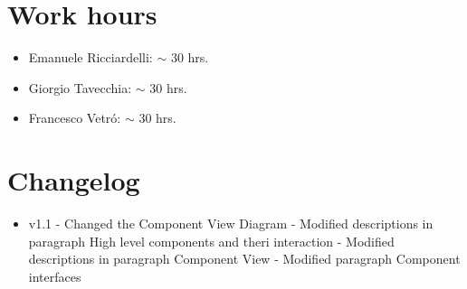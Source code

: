 \documentclass[10pt, a4paper,titlepage]{article}
\begin{document}
\section*{Work hours} 
\begin{itemize}
\item Emanuele Ricciardelli: $\sim$ 30 hrs.
\item Giorgio Tavecchia: $\sim$ 30 hrs.
\item Francesco Vetr\'o: $\sim$ 30 hrs.
\end{itemize}
\section*{Changelog}
\begin{itemize}
\item v1.1
\subitem - Changed the Component View Diagram
\subitem - Modified descriptions in paragraph High level components and theri interaction
\subitem - Modified descriptions in paragraph Component View
\subitem - Modified paragraph Component interfaces
\end{itemize}
\enddocument
\end{document}
